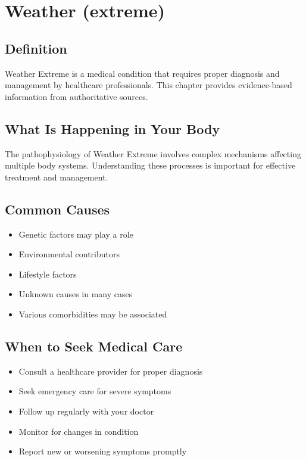 
\chapter{Weather (extreme)}

\section*{Definition}
Weather Extreme is a medical condition that requires proper diagnosis and management by healthcare professionals. This chapter provides evidence-based information from authoritative sources.

\section*{What Is Happening in Your Body}
The pathophysiology of Weather Extreme involves complex mechanisms affecting multiple body systems. Understanding these processes is important for effective treatment and management.

\section*{Common Causes}
\begin{itemize}
  \item Genetic factors may play a role
  \item Environmental contributors
  \item Lifestyle factors
  \item Unknown causes in many cases
  \item Various comorbidities may be associated
\end{itemize}

\section*{When to Seek Medical Care}
\begin{itemize}
  \item Consult a healthcare provider for proper diagnosis
  \item Seek emergency care for severe symptoms
  \item Follow up regularly with your doctor
  \item Monitor for changes in condition
  \item Report new or worsening symptoms promptly
\end{itemize}

